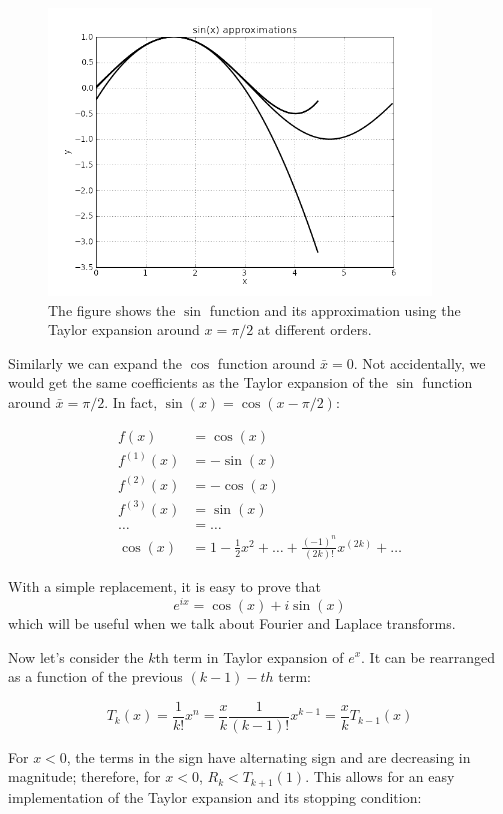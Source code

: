 \documentclass[justified,sixbynine]{tufte-book}
\theoremstyle{plain}%
\theoremstyle{definition}
\theoremstyle{remark}
\begin{document}
\begin{fullwidth}
\begin{figure}[ht]
\centering\includegraphics[width=4in]{images/sin2.png}
\caption{The figure shows the $\sin$ function and its approximation using the Taylor expansion around $x=\pi/2$ at different orders.}
\end{figure}

Similarly we can expand the $\cos$ function around $\bar x = 0$. Not accidentally, we would get the same coefficients as the Taylor expansion of the $\sin$ function around $\bar x = \pi/2$. In fact, $\sin(x) = \cos(x-\pi/2)$:

\begin{align}
f(x) &= \cos(x) \\
f^{(1)}(x) &= -\sin(x) \\
f^{(2)}(x) &= -\cos(x) \\
f^{(3)}(x) &= \sin(x) \\
\dots &= \dots \\
\cos(x) &=  1 - \frac1{2}x^2 + \dots + \frac{(-1)^n}{(2k)!}x^{(2k)} +\dots 
\end{align}

With a simple replacement, it is easy to prove that
\begin{equation}
e^{ix} = \cos(x) + i \sin(x)
\end{equation}
which will be useful when we talk about Fourier and Laplace transforms.

Now let's consider the $k$th term in Taylor expansion of $e^x$. It can be rearranged as a function of the previous $(k-1)-th$ term:

\begin{equation}
T_k(x) = \frac1{k!}x^n = \frac{x}{k} \frac1{(k-1)!}x^{k-1} = \frac{x}{k} T_{k-1}(x)
\end{equation}

For $x<0$, the terms in the sign have alternating sign and are decreasing in magnitude; therefore, for $x<0$, $R_k<T_{k+1}(1)$. This allows for an easy implementation of the Taylor expansion and its stopping condition:


\end{fullwidth}
\end{document}
